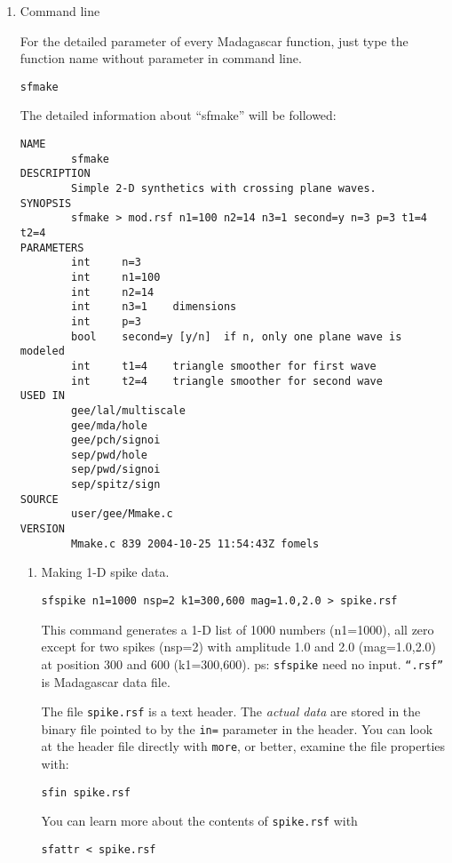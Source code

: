 \begin{enumerate}
\item Command line

For the detailed parameter of every Madagascar function, just type
the function name without parameter in command line.

\begin{verbatim}
sfmake
\end{verbatim} 

The detailed information about ``sfmake'' will be followed:

\begin{verbatim}
NAME
        sfmake
DESCRIPTION
        Simple 2-D synthetics with crossing plane waves.
SYNOPSIS
        sfmake > mod.rsf n1=100 n2=14 n3=1 second=y n=3 p=3 t1=4 t2=4
PARAMETERS
        int     n=3     
        int     n1=100  
        int     n2=14   
        int     n3=1    dimensions 
        int     p=3     
        bool    second=y [y/n]  if n, only one plane wave is modeled 
        int     t1=4    triangle smoother for first wave 
        int     t2=4    triangle smoother for second wave
USED IN
        gee/lal/multiscale
        gee/mda/hole
        gee/pch/signoi
        sep/pwd/hole
        sep/pwd/signoi
        sep/spitz/sign
SOURCE
        user/gee/Mmake.c
VERSION
        Mmake.c 839 2004-10-25 11:54:43Z fomels
\end{verbatim}

{\begin{enumerate}
\item Making 1-D spike data.

\begin{verbatim}
sfspike n1=1000 nsp=2 k1=300,600 mag=1.0,2.0 > spike.rsf
\end{verbatim}
This command generates a 1-D list of 1000 numbers (n1=1000), all zero
except for two spikes (nsp=2) with amplitude 1.0 and 2.0 (mag=1.0,2.0)
at position 300 and 600 (k1=300,600). ps: \texttt{sfspike} need no input.
\texttt{``.rsf''} is Madagascar data file.

The file \texttt{spike.rsf} is a text header. The \emph{actual data}
are stored in the binary file pointed to by the \texttt{in=} parameter
in the header. You can look at the header file directly with
\texttt{more}, or better, examine the file properties with:
\begin{verbatim}
sfin spike.rsf
\end{verbatim}
You can learn more about the contents of \texttt{spike.rsf} with
\begin{verbatim}
sfattr < spike.rsf
\end{verbatim}


\end{enumerate}}
\end{enumerate}
